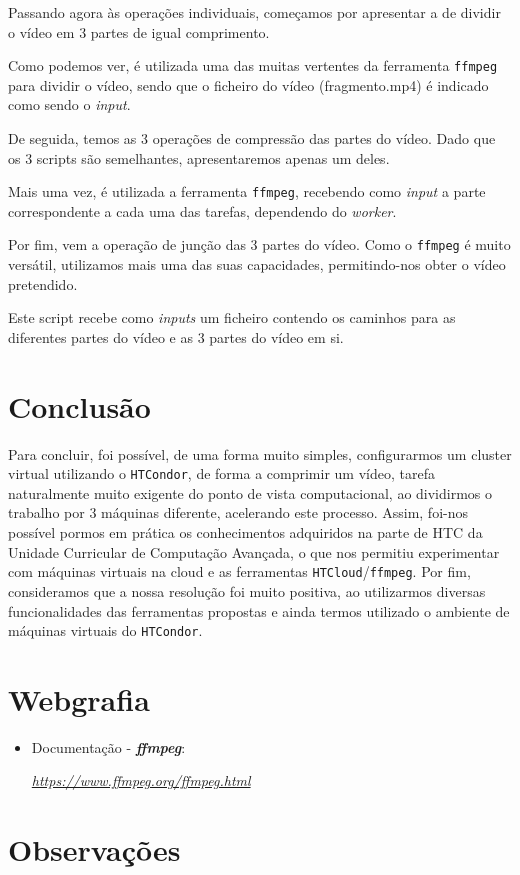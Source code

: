 \documentclass[a4paper]{report}
\begin{document}
	Passando agora às operações individuais, começamos por apresentar a de dividir o vídeo em 3 partes de igual comprimento.
	
	
	Como podemos ver, é utilizada uma das muitas vertentes da ferramenta \texttt{ffmpeg} para dividir o vídeo, sendo que o ficheiro do vídeo (fragmento.mp4) é indicado como sendo o \textit{input}.
	
	De seguida, temos as 3 operações de compressão das partes do vídeo. Dado que os 3 scripts são semelhantes, apresentaremos apenas um deles.
	
	
	Mais uma vez, é utilizada a ferramenta \texttt{ffmpeg}, recebendo como \textit{input} a parte correspondente a cada uma das tarefas, dependendo do \textit{worker}.
	
	Por fim, vem a operação de junção das 3 partes do vídeo. Como o \texttt{ffmpeg} é muito versátil, utilizamos mais uma das suas capacidades, permitindo-nos obter o vídeo pretendido.
	
	
	Este script recebe como \textit{inputs} um ficheiro contendo os caminhos para as diferentes partes do vídeo e as 3 partes do vídeo em si.

\chapter{Conclusão}
\large{
	Para concluir, foi possível, de uma forma muito simples, configurarmos um cluster virtual utilizando o \texttt{HTCondor}, de forma a comprimir um vídeo, tarefa naturalmente muito exigente do ponto de vista computacional, ao dividirmos o trabalho por 3 máquinas diferente, acelerando este processo.
	Assim, foi-nos possível pormos em prática os conhecimentos adquiridos na parte de HTC da Unidade Curricular de Computação Avançada, o que nos permitiu experimentar com máquinas virtuais na cloud e as ferramentas \texttt{HTCloud}/\texttt{ffmpeg}.
	Por fim, consideramos que a nossa resolução foi muito positiva, ao utilizarmos diversas funcionalidades das ferramentas propostas e ainda termos utilizado o ambiente de máquinas virtuais do \texttt{HTCondor}.
}

\chapter{Webgrafia}
    \begin{itemize}
        \item Documentação - \textbf{\textit{ffmpeg}}:
        \par \textit{\url{https://www.ffmpeg.org/ffmpeg.html}}
    \end{itemize}

\appendix
\chapter{Observações}
\end{document}
